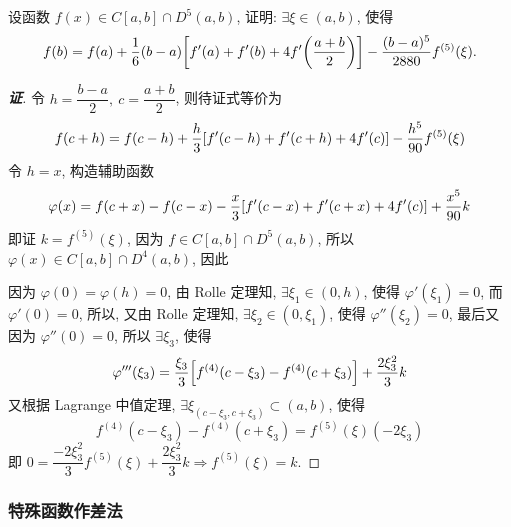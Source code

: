 \begin{example}
    设函数 $\displaystyle f(x)\in C[a,b]\cap D^5(a,b)$, 证明: $\exists\xi\in(a,b)$, 使得
    $$f(b)=f(a)+\dfrac{1}{6}(b-a)\qty[f'(a)+f'(b)+4f'\qty(\dfrac{a+b}{2})]-\dfrac{(b-a)^5}{2880}f^{(5)}(\xi).$$
\end{example}
\begin{proof}[{\songti \textbf{证}}]
    令 $h=\dfrac{b-a}{2},~c=\dfrac{a+b}{2}$, 则待证式等价为
    $$f(c+h)=f(c-h)+\dfrac{h}{3}\qty[f'(c-h)+f'(c+h)+4f'(c)]-\dfrac{h^5}{90}f^{(5)}(\xi)$$
    令 $h=x$, 构造辅助函数 $$\varphi(x)=f(c+x)-f(c-x)-\dfrac{x}{3}\qty[f'(c-x)+f'(c+x)+4f'(c)]+\dfrac{x^5}{90}k$$
    即证 $k=f^{(5)}(\xi)$, 因为 $f\in C[a,b]\cap D^5(a,b)$, 所以 $\varphi(x)\in C[a,b]\cap D^4(a,b)$, 因此
    因为 $\varphi(0)=\varphi(h)=0$, 由 Rolle 定理知, $\exists\xi_1\in(0,h)$, 使得 $\varphi'(\xi_1)=0$, 而 $\varphi'(0)=0$, 所以, 又由 Rolle 定理知, $\exists\xi_2\in(0,\xi_1)$, 使得 $\varphi''(\xi_2)=0$, 最后又因为 $\varphi''(0)=0$, 所以 $\exists\xi_3$, 使得
    $$\varphi'''(\xi_3)=\dfrac{\xi_3}{3}\qty[f^{(4)}(c-\xi_3)-f^{(4)}(c+\xi_3)]+\dfrac{2\xi_3^2}{3}k$$
    又根据 Lagrange 中值定理, $\exists\xi_(c-\xi_3,c+\xi_3)\subset(a,b)$, 使得 $$f^{(4)}(c-\xi_3)-f^{(4)}(c+\xi_3)=f^{(5)}(\xi)(-2\xi_3)$$
    即 $0=\dfrac{-2\xi_3^2}{3}f^{(5)}(\xi)+\dfrac{2\xi_3^2}{3}k\Rightarrow f^{(5)}(\xi)=k$.
\end{proof}

\subsubsection{特殊函数作差法}

